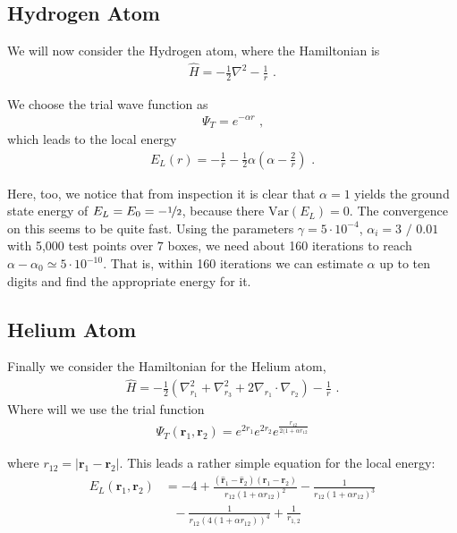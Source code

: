 \subsection{Hydrogen Atom}
We will now consider the Hydrogen atom, where the Hamiltonian is
\begin{align}
  \hat{H} = -\frac{1}{2}\nabla^2 - \frac{1}{r} \text{~.}
\end{align}

We choose the trial wave function as
  \begin{align}
    \Psi_T = e^{-\alpha r} \text{~,}
  \end{align}
which leads to the local energy
  \begin{align}
    E_L(r) = - \frac{1}{r} - \frac{1}{2}\alpha \left(\alpha - \frac{2}{r}\right) \text{~.}
  \end{align}

Here, too, we notice that from inspection it is clear that $\alpha = 1$ yields the ground state energy of $E_L = E_0 = -\nicefrac{1}{2}$, because there $\text{Var}(E_L) = 0$. The convergence on this seems to be quite fast. Using the parameters $\gamma = 5\cdot 10^{-4}$, $\alpha_i = 3 \text{~/~}0.01$ with 5,000 test points over $7$ boxes, we need about 160 iterations to reach $\alpha-\alpha_0 \simeq 5 \cdot 10^{-10}$. That is, within 160 iterations we can estimate $\alpha$ up to ten digits and find the appropriate energy for it. 


\subsection{Helium Atom}
Finally we consider the Hamiltonian for the Helium atom,
\begin{align}
  \hat{H} = -\frac{1}{2} \left(\nabla_{r_1}^2 + \nabla_{r_3}^2 + 2\nabla_{r_1}\cdot \nabla_{r_2}\right)  - \frac{1}{r} \text{~.}
\end{align}
Where will we use the trial function
  \begin{align}
    \Psi_T (\textbf{r}_1,\textbf{r}_2) = e^{2r_1}e^{2r_2}e^{\frac{r_{12}}{2(1+\alpha r_{12}}}
  \end{align}

where $r_{12} =  \left|\textbf{r}_1 - \textbf{r}_2 \right| $. This leads a rather simple equation for the local energy:
\begin{align*}
    E_L(\textbf{r}_1,\textbf{r}_2) &= -4  +  \frac{(\hat{\textbf{r}}_1 - \hat{\textbf{r}}_2) (\textbf{r}_1 - \textbf{r}_2)}{r_{12}(1+\alpha r_{12})^2} - \frac{1}{r_{12}(1+\alpha r_{12})^3}  \\
    &~~~ - \frac{1}{r_{12}(4(1+\alpha r_{12}))^4} + \frac{1}{r_{1,2}}
\end{align*}
  
